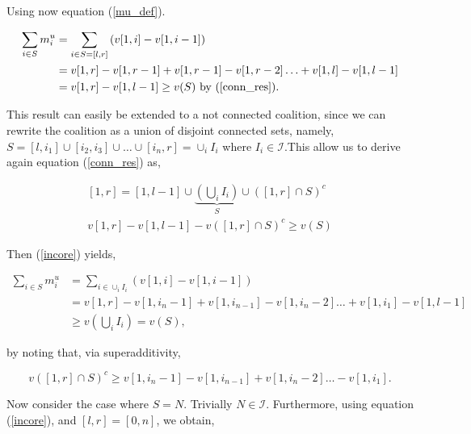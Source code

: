\documentclass[american]{scrartcl}
\begin{document}
Using now equation (\ref{mu_def}).

\begin{equation} \label{incore}
    \begin{split}
        \sum_{i \in S} m^u_i &= \sum_{i \in S = [l, r]} \left(v[1, i] - v[1, i-1]\right) \\
        &= v[1, r] - v[1, r - 1] + v[1, r -1] - v[1,  r - 2] \ldots + v[1, l] - v[1, l-1] \\
        &= v[1, r] - v[1, l - 1] \geq v(S) \text{ by (\ref{conn_res}).}
    \end{split}
\end{equation}

This result can easily be extended to a not connected coalition, since we can rewrite the coalition as a union of disjoint connected sets, namely, $S = [l, i_1] \cup [i_2, i_3] \cup \dots \cup [i_n, r] = \cup_i I_i$ where $I_i \in \mathcal{I}$.This allow us to derive again equation (\ref{conn_res}) as,

\begin{equation}
    \begin{split}
        [1, r] = [1, l - 1] \cup \underbrace{\left(\bigcup_i I_i\right)}_{S} \cup \left([1, r] \cap S\right)^c \\
        v[1, r] - v[1, l - 1] - v\left([1, r] \cap S\right)^c \geq v(S)
    \end{split}
\end{equation}

Then (\ref{incore}) yields,

\begin{equation} \label{greater}
    \begin{split}
        \sum_{i \in S} m^u_i &= \sum_{i \in \cup_i I_i} \left(v[1, i] - v[1, i-1]\right) \\
        &= v[1, r] - v[1, i_n - 1] + v[1, i_{n-1}] - v[1, i_n - 2] \ldots + v[1, i_1] - v[1, l-1] \\
        &\geq v\left(\bigcup_i I_i\right) = v(S),
    \end{split}
\end{equation}

by noting that, via superadditivity,

\begin{equation}
    v\left([1, r] \cap S\right)^c \geq v[1, i_n - 1] - v[1, i_{n-1}] + v[1, i_n - 2] \ldots - v[1, i_1].
\end{equation}

Now consider the case where $S = N$. Trivially $N \in \mathcal{I}$. Furthermore, using equation (\ref{incore}), and $[l, r] = [0, n]$, we obtain,
\end{document}
